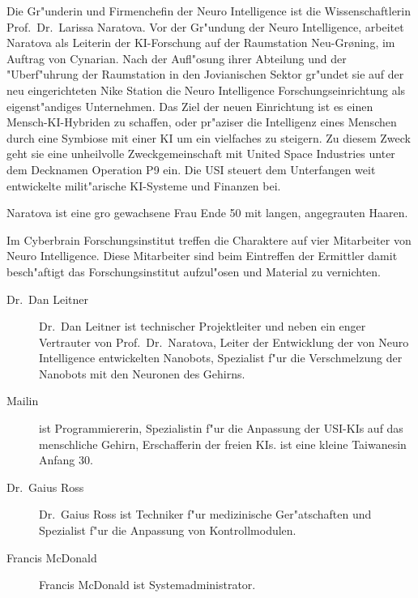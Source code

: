 \renewcommand{\ml}{\pinyin{Mailin2}}


Die Gr"underin und Firmenchefin der Neuro Intelligence ist die Wissenschaftlerin Prof.~Dr.~Larissa Naratova. Vor der Gr"undung der Neuro Intelligence, arbeitet Naratova als Leiterin der KI-Forschung auf der Raumstation Neu-Gr{\o}ning, im Auftrag von Cynarian. Nach der Aufl"osung ihrer Abteilung und der "Uberf"uhrung der Raumstation in den Jovianischen Sektor gr"undet sie auf der neu eingerichteten Nike Station die Neuro Intelligence Forschungseinrichtung als eigenst"andiges Unternehmen. Das Ziel der neuen Einrichtung ist es einen Mensch-KI-Hybriden zu schaffen, oder pr"aziser die Intelligenz eines Menschen durch eine Symbiose mit einer KI um ein vielfaches zu steigern. Zu diesem Zweck  geht sie eine unheilvolle Zweckgemeinschaft mit United Space Industries unter dem Decknamen Operation P9 ein. Die USI steuert dem Unterfangen weit entwickelte milit"arische KI-Systeme und Finanzen bei.

Naratova ist eine gro\3 gewachsene Frau Ende 50 mit langen, angegrauten Haaren. 


Im Cyberbrain Forschungsinstitut treffen die Charaktere auf vier Mitarbeiter von Neuro Intelligence. Diese Mitarbeiter sind beim Eintreffen der Ermittler damit besch"aftigt das Forschungsinstitut aufzul"osen und Material zu vernichten.

\begin{description}
    \item[Dr.~Dan Leitner] Dr.~Dan Leitner ist technischer Projektleiter und neben \ml{} ein enger Vertrauter von Prof.~Dr.~Naratova, 
        Leiter der Entwicklung der von Neuro Intelligence entwickelten Nanobots, Spezialist f"ur die Verschmelzung der Nanobots mit den Neuronen des Gehirns.
    \item[Mailin] \ml{} ist Programmiererin, Spezialistin f"ur die Anpassung der USI-KIs auf das menschliche Gehirn, Erschafferin der 
        freien KIs. \ml{} ist eine kleine Taiwanesin Anfang 30.
    \item[Dr.~Gaius Ross] Dr.~Gaius Ross ist Techniker f"ur medizinische Ger"atschaften und Spezialist f"ur die Anpassung von Kontrollmodulen.
    \item[Francis McDonald] Francis McDonald ist Systemadministrator.
\end{description}

